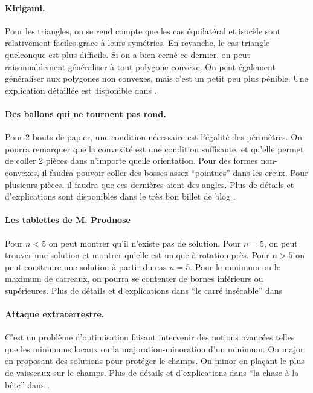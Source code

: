 \documentclass[a4paper,10pt,oneside]{article}
\begin{document}
\paragraph*{Kirigami.}
Pour les triangles, on se rend compte que les cas équilatéral et isocèle sont relativement faciles grace à leurs symétries.
En revanche, le cas triangle quelconque est plus difficile.
Si on a bien cerné ce dernier, on peut raisonnablement généraliser à tout polygone convexe.
On peut également généraliser aux polygones non convexes, mais c'est un petit peu plus pénible.
Une explication détaillée est disponible dans \cite{fiorellivilmartCoupCiseaux2010}.

\paragraph*{Des ballons qui ne tournent pas rond.}
Pour 2 bouts de papier, une condition nécessaire est l'égalité des périmètres.
On pourra remarquer que la convexité est une condition suffisante, et qu'elle permet de coller 2 pièces dans n'importe quelle orientation.
Pour des formes non-convexes, il faudra pouvoir coller des bosses assez ``pointues'' dans les creux.
Pour plusieurs pièces, il faudra que ces dernières aient des angles.
Plus de détails et d'explications sont disponibles dans le très bon billet de blog \cite{ghysBrazucaBallonCubique2014}.

\paragraph*{Les tablettes de M. Prodnose}
Pour $n<5$ on peut montrer qu'il n'existe pas de solution.
Pour $n=5$, on peut trouver une solution et montrer qu'elle est unique à rotation près.
Pour $n>5$ on peut construire une solution à partir du cas $n=5$.
Pour le minimum ou le maximum de carreaux, on pourra se contenter de bornes inférieurs ou supérieures.
Plus de détails et d'explications dans ``le carré insécable'' dans \cite{grenierSituationsRecherchePour2017}

\paragraph*{Attaque extraterrestre.}
C'est un problème d'optimisation faisant intervenir des notions avancées telles que les minimums locaux ou la majoration-minoration d'un minimum.
On major en proposant des solutions pour protéger le champs.
On minor en plaçant le plus de vaisseaux sur le champs.
Plus de détails et d'explications dans ``la chase à la bête'' dans \cite{grenierSituationsRecherchePour2017}.
\end{document}
